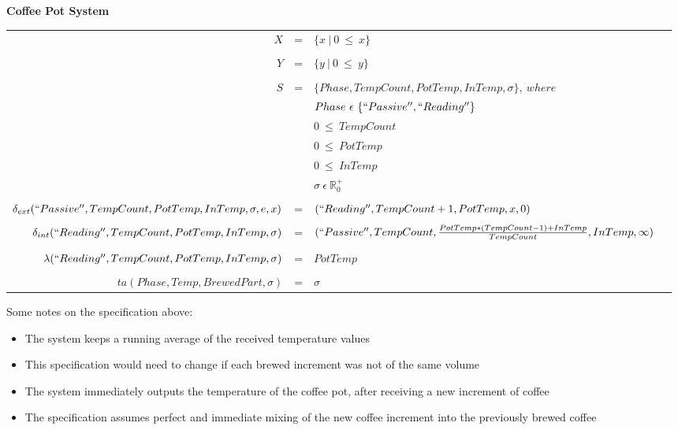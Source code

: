 \documentclass[10pt]{article}
\begin{document}
\textbf{Coffee Pot System}

\begin{footnotesize}
\begin{center}
  \begin{tabular}{r c l l}
    $X$ & = & $\{x~|~0~\leq~x\}$ \\
    \\
    $Y$ & = & $\{y~|~0~\leq~y\}$ \\
    \\
    $S$ & = & $\{Phase,TempCount,PotTemp,InTemp,\sigma\},~where$ \vspace{0.1cm}\\
    & & $Phase~\epsilon~\{``Passive'',``Reading''\}$ \vspace{0.1cm}\\
    & & $0~\leq~TempCount$ \vspace{0.1cm}\\
    & & $0~\leq~PotTemp$ \vspace{0.1cm}\\
    & & $0~\leq~InTemp$ \vspace{0.1cm}\\
    & & $\sigma~\epsilon~\mathbb{R}_{0}^{+}$ \\
    \\
    $\delta_{ext}(``Passive'',TempCount,PotTemp,InTemp,\sigma,e,x)$ & = & $(``Reading'',TempCount+1,PotTemp,x,0)$ \\
    \\
    $\delta_{int}(``Reading'',TempCount,PotTemp,InTemp,\sigma)$ & = & $(``Passive'',TempCount,\frac{PotTemp*(TempCount-1)+InTemp}{TempCount},InTemp,\infty)$ \\
    \\
    $\lambda(``Reading'',TempCount,PotTemp,InTemp,\sigma)$ & = & $PotTemp$ \\
    \\
    $ta(Phase,Temp,BrewedPart,\sigma)$ & = & $\sigma$ \\
  \end{tabular}
\end{center}
\end{footnotesize}

Some notes on the specification above:
\begin{itemize}
\item The system keeps a running average of the received temperature values
\item This specification would need to change if each brewed increment was not of the same volume
\item The system immediately outputs the temperature of the coffee pot, after receiving a new increment of coffee
\item The specification assumes perfect and immediate mixing of the new coffee increment into the previously brewed coffee
\end{itemize}
  
\end{document}
